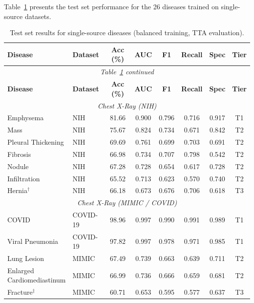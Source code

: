 \documentclass[12pt,a4paper]{report}
\begin{document}
Table~\ref{tab:baseline_results} presents the test set performance for the 26 diseases trained on single-source datasets.

\begingroup\footnotesize
\setlength{\tabcolsep}{4pt}
\setlength{\LTleft}{0pt plus 1fill}
\setlength{\LTright}{0pt plus 1fill}
\begin{longtable}{@{}llcccccc@{}}
\caption{Test set results for single-source diseases (balanced training, TTA evaluation).} \label{tab:baseline_results} \\
\toprule
\textbf{Disease} & \textbf{Dataset} & \textbf{Acc (\%)} & \textbf{AUC} & \textbf{F1} & \textbf{Recall} & \textbf{Spec} & \textbf{Tier} \\
\midrule
\endfirsthead
\multicolumn{8}{c}{\footnotesize\textit{Table~\ref{tab:baseline_results} continued}} \\
\toprule
\textbf{Disease} & \textbf{Dataset} & \textbf{Acc (\%)} & \textbf{AUC} & \textbf{F1} & \textbf{Recall} & \textbf{Spec} & \textbf{Tier} \\
\midrule
\endhead
\midrule
\multicolumn{8}{c}{\textit{Chest X-Ray (NIH)}} \\
\midrule
Emphysema & NIH & 81.66 & 0.900 & 0.796 & 0.716 & 0.917 & T1 \\
Mass & NIH & 75.67 & 0.824 & 0.734 & 0.671 & 0.842 & T2 \\
Pleural Thickening & NIH & 69.69 & 0.761 & 0.699 & 0.703 & 0.691 & T2 \\
Fibrosis & NIH & 66.98 & 0.734 & 0.707 & 0.798 & 0.542 & T2 \\
Nodule & NIH & 67.28 & 0.728 & 0.654 & 0.617 & 0.728 & T2 \\
Infiltration & NIH & 65.52 & 0.713 & 0.623 & 0.570 & 0.740 & T2 \\
Hernia$^\dagger$ & NIH & 66.18 & 0.673 & 0.676 & 0.706 & 0.618 & T3 \\
\midrule
\multicolumn{8}{c}{\textit{Chest X-Ray (MIMIC / COVID)}} \\
\midrule
COVID & COVID-19 & 98.96 & 0.997 & 0.990 & 0.991 & 0.989 & T1 \\
Viral Pneumonia & COVID-19 & 97.82 & 0.997 & 0.978 & 0.971 & 0.985 & T1 \\
Lung Lesion & MIMIC & 67.49 & 0.739 & 0.663 & 0.639 & 0.711 & T2 \\
\makecell[l]{Enlarged\\Cardiomediastinum} & MIMIC & 66.99 & 0.736 & 0.666 & 0.659 & 0.681 & T2 \\
Fracture$^\ddagger$ & MIMIC & 60.71 & 0.653 & 0.595 & 0.577 & 0.637 & T3 \\

\end{longtable}
\end{document}
